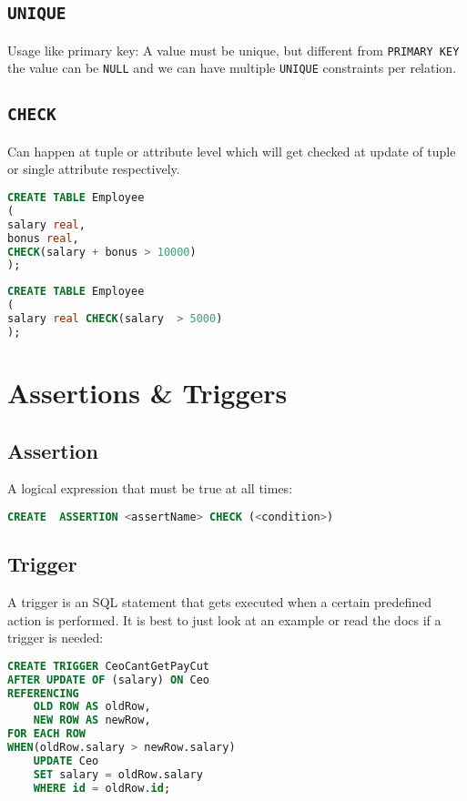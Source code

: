 \documentclass{sciposter}
\renewcommand{\t}[1]{\texttt{#1}}
\begin{document}
\begin{multicols}{3}
\subsection*{\t{UNIQUE}}
Usage like primary key: A value must be unique, but different from \t{PRIMARY KEY} the value can be \t{NULL} and we can have multiple \t{UNIQUE} constraints per relation.

\subsection*{\t{CHECK}}
Can happen at tuple or attribute level which will get checked at update of tuple or single attribute respectively.
\begin{lstlisting}[language=SQL]
CREATE TABLE Employee
(
salary real,
bonus real,
CHECK(salary + bonus > 10000)
);
\end{lstlisting}

\begin{lstlisting}[language=SQL]
CREATE TABLE Employee
(
salary real CHECK(salary  > 5000)
);
\end{lstlisting}


\section*{Assertions \& Triggers}

\subsection*{Assertion}
A logical expression that must be true at all times:
\begin{lstlisting}[language=SQL]
CREATE  ASSERTION <assertName> CHECK (<condition>)
\end{lstlisting}

\subsection*{Trigger}
A trigger is an SQL statement that gets executed when a certain predefined action is performed. It is best to just look at an example or read the docs if a trigger is needed:

\begin{lstlisting}[language=SQL]
CREATE TRIGGER CeoCantGetPayCut
AFTER UPDATE OF (salary) ON Ceo
REFERENCING
	OLD ROW AS oldRow,
	NEW ROW AS newRow,
FOR EACH ROW
WHEN(oldRow.salary > newRow.salary)
	UPDATE Ceo
	SET salary = oldRow.salary
	WHERE id = oldRow.id;
\end{lstlisting}



\newpage


\end{multicols}
\end{document}
